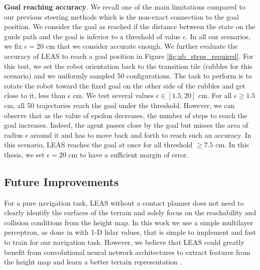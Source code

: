 \hfill

\noindent\textbf{Goal reaching accuracy}.
We recall one of the main limitations compared to our previous steering methods which is the non-exact connection to the goal position. We consider the goal as reached if the distance between the state on the guide path and the goal is inferior to a threshold of value $\epsilon$. In all our scenarios, we fix $\epsilon = 20$ cm that we consider accurate enough.
We further evaluate the accuracy of LEAS to reach a goal position in Figure \ref{fig:nb_steps_required}. For this test, we set the robot orientation back to the transition tile (rubbles for this scenario) and we uniformly sampled 50 configurations. The task to perform is to rotate the robot toward the fixed goal on the other side of the rubbles and get close to it, less than $\epsilon$ cm.
We test several values $\epsilon \in [1.5, 20]$ cm. 
For all $\epsilon \geq 1.5$ cm, all 50 trajectories reach the goal under the threshold. However, we can observe that as the value of epsilon decreases, the number of steps to reach the goal increases. Indeed, the agent passes close by the goal but misses the area of radius $\epsilon$ around it and has to move back and forth to reach such an accuracy. 
In this scenario, LEAS reaches the goal at once for all threshold $\geq 7.5 $ cm. In this thesis, we set $\epsilon=20$ cm to have a sufficient margin of error.

\subsection{Future Improvements}

For a pure navigation task, LEAS without a contact planner does not need to clearly identify the surfaces of the terrain and solely focus on the reachability and collision conditions from the height map.
In this work we use a simple multilayer perceptron, as done in \cite{RL_RRT, RL_RRT_AUTORL} with 1-D lidar values, that is simple to implement and fast to train for our navigation task. 
However, we believe that LEAS could greatly benefit from convolutional neural network architectures to extract features from the height map and learn a better terrain representation \cite{deepLoco,deepGait,RLOC}.

